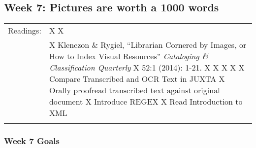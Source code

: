 \documentclass[]{article}
\begin{document}
\subsection{Week 7: Pictures are worth a 1000
words}\label{week-7-pictures-are-worth-a-1000-words}

\begin{longtable}[c]{@{}ll@{}}
\toprule\addlinespace
\begin{minipage}[t]{0.18\columnwidth}\raggedright
Readings:
\end{minipage} & \begin{minipage}[t]{0.76\columnwidth}\raggedright
X X
\end{minipage}
\\\addlinespace
\begin{minipage}[t]{0.18\columnwidth}\raggedright
\end{minipage} & \begin{minipage}[t]{0.76\columnwidth}\raggedright
X Klenczon \& Rygiel, ``Librarian Cornered by Images, or How to Index
Visual Resources'' \emph{Cataloging \& Classification Quarterly} X 52:1
(2014): 1-21. X X X X X Compare Transcribed and OCR Text in JUXTA X
Orally proofread transcribed text against original document X Introduce
REGEX X Read Introduction to XML
\end{minipage}
\\\addlinespace
\bottomrule
\end{longtable}

\subsubsection{Week 7 Goals}\label{week-7-goals}
\end{document}
